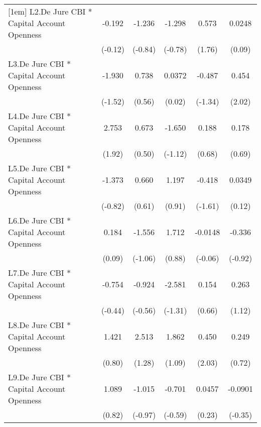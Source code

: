 {\begin{longtable}{l*{5}{c}}
[1em]
L2.De Jure CBI * Capital Account Openness&   -0.192         &   -1.236         &   -1.298         &    0.573         &   0.0248         \\
                &  (-0.12)         &  (-0.84)         &  (-0.78)         &   (1.76)         &   (0.09)         \\
[1em]
L3.De Jure CBI * Capital Account Openness&   -1.930         &    0.738         &   0.0372         &   -0.487         &    0.454\sym{*}  \\
                &  (-1.52)         &   (0.56)         &   (0.02)         &  (-1.34)         &   (2.02)         \\
[1em]
L4.De Jure CBI * Capital Account Openness&    2.753         &    0.673         &   -1.650         &    0.188         &    0.178         \\
                &   (1.92)         &   (0.50)         &  (-1.12)         &   (0.68)         &   (0.69)         \\
[1em]
L5.De Jure CBI * Capital Account Openness&   -1.373         &    0.660         &    1.197         &   -0.418         &   0.0349         \\
                &  (-0.82)         &   (0.61)         &   (0.91)         &  (-1.61)         &   (0.12)         \\
[1em]
L6.De Jure CBI * Capital Account Openness&    0.184         &   -1.556         &    1.712         &  -0.0148         &   -0.336         \\
                &   (0.09)         &  (-1.06)         &   (0.88)         &  (-0.06)         &  (-0.92)         \\
[1em]
L7.De Jure CBI * Capital Account Openness&   -0.754         &   -0.924         &   -2.581         &    0.154         &    0.263         \\
                &  (-0.44)         &  (-0.56)         &  (-1.31)         &   (0.66)         &   (1.12)         \\
[1em]
L8.De Jure CBI * Capital Account Openness&    1.421         &    2.513         &    1.862         &    0.450\sym{*}  &    0.249         \\
                &   (0.80)         &   (1.28)         &   (1.09)         &   (2.03)         &   (0.72)         \\
[1em]
L9.De Jure CBI * Capital Account Openness&    1.089         &   -1.015         &   -0.701         &   0.0457         &  -0.0901         \\
                &   (0.82)         &  (-0.97)         &  (-0.59)         &   (0.23)         &  (-0.35)         \\

\end{longtable}}
